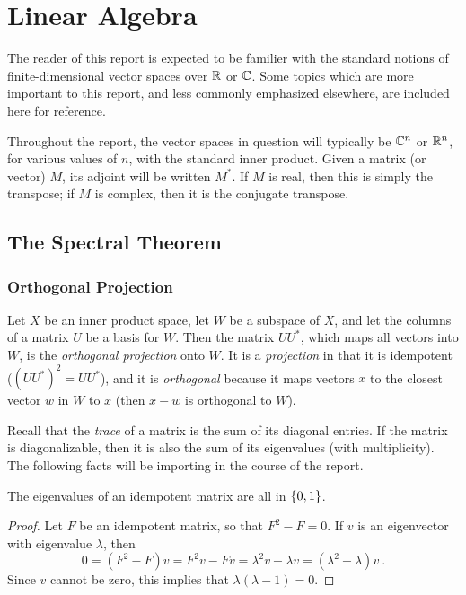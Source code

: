 \documentclass{report}
\begin{document}
\chapter{Linear Algebra}

  The reader of this report is expected to be familier with the standard notions
  of finite-dimensional vector spaces over $\mathbb{R}$ or $\mathbb{C}$.  Some topics which are
  more important to this report, and less commonly emphasized elsewhere, are
  included here for reference.

  Throughout the report, the vector spaces in question will typically be $\mathbb{C}^n$
  or $\mathbb{R}^n$, for various values of $n$, with the standard inner product.  Given
  a matrix (or vector) $M$, its adjoint will be written $M^*$.  If $M$ is real,
  then this is simply the transpose; if $M$ is complex, then it is the conjugate
  transpose.

  \section{The Spectral Theorem}
    \subsection{Orthogonal Projection}

      Let $X$ be an inner product space, let $W$ be a subspace of $X$, and let
      the columns of a matrix $U$ be a basis for $W$.  Then the matrix $UU^*$,
      which maps all vectors into $W$, is the \textit{orthogonal projection}
      onto $W$.  It is a \textit{projection} in that it is idempotent ($(UU^*)^2
      = UU^*$), and it is \textit{orthogonal} because it maps vectors $x$ to the
      closest vector $w$ in $W$ to $x$ (then $x - w$ is orthogonal to $W$).

      Recall that the \textit{trace} of a matrix is the sum of its diagonal
      entries.  If the matrix is diagonalizable, then it is also the sum of its
      eigenvalues (with multiplicity).  The following facts will be importing in
      the course of the report.

      \begin{lem}
        The eigenvalues of an idempotent matrix are all in $\left\lbrace 0, 1 \right\rbrace$.
      \end{lem}

      \begin{proof}
        Let $F$ be an idempotent matrix, so that $F^2 - F = 0$.  If $v$ is an
        eigenvector with eigenvalue $\lambda$, then
        $$
          0 =(F^2 - F)v = F^2v - Fv = \lambda^2 v - \lambda v = (\lambda^2 -
          \lambda)v \ .
        $$
        Since $v$ cannot be zero, this implies that $\lambda(\lambda - 1) = 0$.
      \end{proof}
\end{document}
